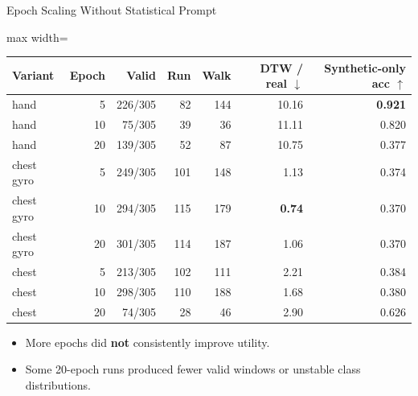 \documentclass[aspectratio=169,11pt]{ctexbeamer}
\newcommand{\up}{\(\uparrow\)}
\newcommand{\down}{\(\downarrow\)}
\newcommand{\best}[1]{\textcolor{goodgreen}{\textbf{#1}}}
\begin{document}
\begin{frame}{Epoch Scaling Without Statistical Prompt}
\small
\begin{adjustbox}{max width=\textwidth}
\begin{tabular}{lrrrrrr}
\toprule
Variant & Epoch & Valid & Run & Walk & DTW / real \down & Synthetic-only acc \up \\
\midrule
hand & 5 & 226/305 & 82 & 144 & 10.16 & \best{0.921} \\
hand & 10 & 75/305 & 39 & 36 & 11.11 & 0.820 \\
hand & 20 & 139/305 & 52 & 87 & 10.75 & 0.377 \\
chest gyro & 5 & 249/305 & 101 & 148 & 1.13 & 0.374 \\
chest gyro & 10 & 294/305 & 115 & 179 & \best{0.74} & 0.370 \\
chest gyro & 20 & 301/305 & 114 & 187 & 1.06 & 0.370 \\
chest & 5 & 213/305 & 102 & 111 & 2.21 & 0.384 \\
chest & 10 & 298/305 & 110 & 188 & 1.68 & 0.380 \\
chest & 20 & 74/305 & 28 & 46 & 2.90 & 0.626 \\
\bottomrule
\end{tabular}
\end{adjustbox}
\vspace{0.5em}
\begin{itemize}
  \item More epochs did \textbf{not} consistently improve utility.
  \item Some 20-epoch runs produced fewer valid windows or unstable class distributions.
\end{itemize}
\end{frame}
\end{document}

